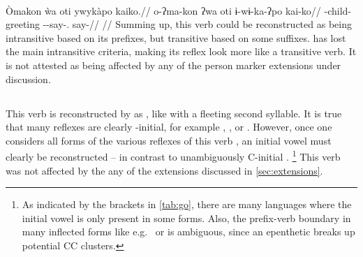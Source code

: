 \kalina \parencite[][202]{courtz2008carib}\\
\begingl
\glpreamble Òmakon \`wa oti ywykàpo kaiko.//
\gla o-ʔma-kon ʔwa oti ɨ-wɨ-ka-ʔpo kai-ko//
\glb {}-child-  greeting --say-. say-//
\glft {}//
\endgl
\xe
%
Summing up, this verb could be reconstructed as being intransitive based on its prefixes, but transitive based on some suffixes.
\hixka has lost the main intransitive criteria, making its reflex look more like a transitive verb.
It is not attested as being affected by any of the person marker extensions under discussion.

\subsection{ }
\label{sec:go}
This verb is reconstructed by \textcite{gildea2007greenberg} as , like   with a fleeting second syllable.
It is true that many reflexes are clearly -initial, for example \hixka {}  \parencite[27]{hixkaryanaderby1985}, \trio {}  \parencite[246]{triomeira1999}, or \wayana {}  \parencite[195]{wayanatavares2005}.
However, once one considers all forms of the various reflexes of this verb , an initial vowel  must clearly be reconstructed -- in contrast to unambiguously C-initial  .%
\footnote{As indicated by the brackets in \cref{tab:go}, there are many languages where the initial vowel is only present in some forms.
Also, the prefix-verb boundary in many inflected forms like e.g.\ \trio {} or \arara {}  \parencites[43]{triomeira1999}[153]{alves2017arara} is ambiguous, since an epenthetic  breaks up potential CC clusters.}
This verb was not affected by the any of the extensions discussed in \cref{sec:extensions}.


%

